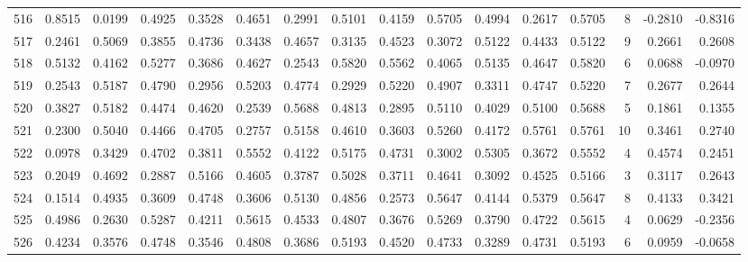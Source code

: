 \begin{tabular}{lrrrrrrrrrrrrrrr}
516 &      0.8515 &  0.0199 &  0.4925 &  0.3528 &  0.4651 &  0.2991 &  0.5101 &  0.4159 &  0.5705 &  0.4994 &   0.2617 &     0.5705 &      8 &                   -0.2810 &                    -0.8316 \\
517 &      0.2461 &  0.5069 &  0.3855 &  0.4736 &  0.3438 &  0.4657 &  0.3135 &  0.4523 &  0.3072 &  0.5122 &   0.4433 &     0.5122 &      9 &                    0.2661 &                     0.2608 \\
518 &      0.5132 &  0.4162 &  0.5277 &  0.3686 &  0.4627 &  0.2543 &  0.5820 &  0.5562 &  0.4065 &  0.5135 &   0.4647 &     0.5820 &      6 &                    0.0688 &                    -0.0970 \\
519 &      0.2543 &  0.5187 &  0.4790 &  0.2956 &  0.5203 &  0.4774 &  0.2929 &  0.5220 &  0.4907 &  0.3311 &   0.4747 &     0.5220 &      7 &                    0.2677 &                     0.2644 \\
520 &      0.3827 &  0.5182 &  0.4474 &  0.4620 &  0.2539 &  0.5688 &  0.4813 &  0.2895 &  0.5110 &  0.4029 &   0.5100 &     0.5688 &      5 &                    0.1861 &                     0.1355 \\
521 &      0.2300 &  0.5040 &  0.4466 &  0.4705 &  0.2757 &  0.5158 &  0.4610 &  0.3603 &  0.5260 &  0.4172 &   0.5761 &     0.5761 &     10 &                    0.3461 &                     0.2740 \\
522 &      0.0978 &  0.3429 &  0.4702 &  0.3811 &  0.5552 &  0.4122 &  0.5175 &  0.4731 &  0.3002 &  0.5305 &   0.3672 &     0.5552 &      4 &                    0.4574 &                     0.2451 \\
523 &      0.2049 &  0.4692 &  0.2887 &  0.5166 &  0.4605 &  0.3787 &  0.5028 &  0.3711 &  0.4641 &  0.3092 &   0.4525 &     0.5166 &      3 &                    0.3117 &                     0.2643 \\
524 &      0.1514 &  0.4935 &  0.3609 &  0.4748 &  0.3606 &  0.5130 &  0.4856 &  0.2573 &  0.5647 &  0.4144 &   0.5379 &     0.5647 &      8 &                    0.4133 &                     0.3421 \\
525 &      0.4986 &  0.2630 &  0.5287 &  0.4211 &  0.5615 &  0.4533 &  0.4807 &  0.3676 &  0.5269 &  0.3790 &   0.4722 &     0.5615 &      4 &                    0.0629 &                    -0.2356 \\
526 &      0.4234 &  0.3576 &  0.4748 &  0.3546 &  0.4808 &  0.3686 &  0.5193 &  0.4520 &  0.4733 &  0.3289 &   0.4731 &     0.5193 &      6 &                    0.0959 &                    -0.0658 \\

\end{tabular}
